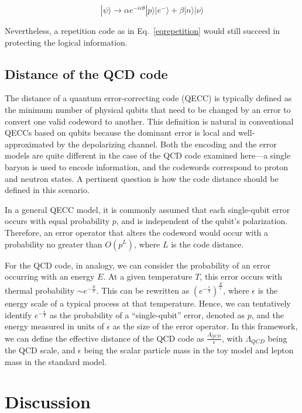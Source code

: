 \documentclass[11pt,english]{article}
\begin{document}
\begin{equation}
    |\psi\rangle\rightarrow \alpha e^{-ie \theta}|p\rangle|e^-\rangle+\beta|n\rangle|\nu\rangle
\end{equation}

Nevertheless, a repetition code as in Eq.~\eqref{eqrepetition} would still succeed in protecting the logical information.


\subsection{Distance of the QCD code}

The distance of a quantum error-correcting code (QECC) is typically defined as the minimum number of physical qubits that need to be changed by an error to convert one valid codeword to another. This definition is natural in conventional QECCs based on qubits because the dominant error is local and well-approximated by the depolarizing channel. Both the encoding and the error models are quite different in the case of the QCD code examined here---a single baryon is used to encode information, and the codewords correspond to proton and neutron states.  A pertinent question is how the code distance should be defined in this scenario. 

In a general QECC model, it is commonly assumed that each single-qubit error occurs with equal probability $p$, and is independent of the qubit's polarization. Therefore, an error operator that alters the codeword would occur with a probability no greater than $O(p^L)$, where $L$ is the code distance. 

For the QCD code, in analogy, we can consider the probability of an error occurring with an energy $E$. At a given temperature $T$, this error occurs with thermal probability $\sim e^{-\frac{E}{T}}$. This can be rewritten as $(e^{-\frac{\epsilon}{T}})^{\frac{E}{\epsilon}}$, where $\epsilon$ is the energy scale of a typical process at that temperature. Hence, we can tentatively identify $e^{-\frac{\epsilon}{T}}$ as the probability of a ``single-qubit'' error, denoted as $p$, and the energy measured in units of $\epsilon$ as the size of the error operator. In this framework, we can define the effective distance of the QCD code as $\frac{\Lambda_{QCD}}{\epsilon}$, with $\Lambda_{QCD}$ being the QCD scale, and $\epsilon$ being the scalar particle mass in the toy model and lepton mass in the standard model.


\section{Discussion}
\label{sec:discussion}
\end{document}
